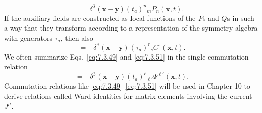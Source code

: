 \begin{equation}
[J_a^0(\mathbf{x},t),P_m(\mathbf{y},t)]
=\delta^3(\mathbf{x}-\mathbf{y})(t_a)^n{}_mP_n(\mathbf{x},t).
\tag{7.3.50}\label{eq:7.3.50}
\end{equation}
If the auxiliary fields are constructed as local functions of the $P$s and
$Q$s in such a way that they transform according to a representation of the
symmetry algebra with generators $\tau_a$, then also
\begin{equation}
[J_a^0(\mathbf{x},t),C^r(\mathbf{y},t)]
=-\delta^3(\mathbf{x}-\mathbf{y})(\tau_a)^r{}_sC^s(\mathbf{x},t).
\tag{7.3.51}\label{eq:7.3.51}
\end{equation}
We often summarize Eqs.~\eqref{eq:7.3.49} and \eqref{eq:7.3.51} in the single commutation
relation
\begin{equation}
[J_a^0(\mathbf{x},t),\Psi^\ell(\mathbf{y},t)]
=-\delta^3(\mathbf{x}-\mathbf{y})(t_a)^\ell{}_{\ell'}
\Psi^{\ell'}(\mathbf{x},t).
\tag{7.3.52}\label{eq:7.3.52}
\end{equation}
Commutation relations like \eqref{eq:7.3.49}--\eqref{eq:7.3.51} will be used in Chapter 10 to
derive relations called Ward identities for matrix elements involving the
current $J^\mu$.
